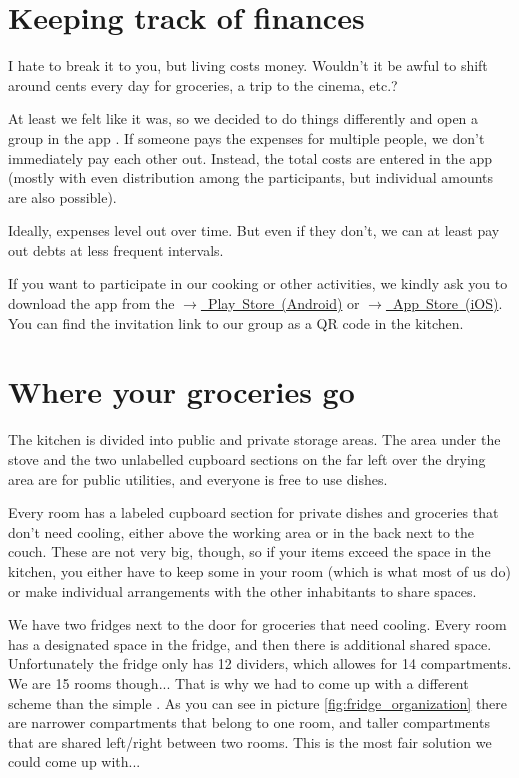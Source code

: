 \section{Keeping track of finances}
I hate to break it to you, but living costs money. Wouldn't it be awful to shift around cents every day for groceries, a trip to the cinema, etc.?

At least we felt like it was, so we decided to do things differently and open a group in the app . If someone pays the expenses for multiple people, we don't immediately pay each other out. Instead, the total costs are entered in the app (mostly with even distribution among the participants, but individual amounts are also possible).

Ideally, expenses level out over time. But even if they don't, we can at least pay out debts at less frequent intervals.

If you want to participate in our cooking or other activities, we kindly ask you to download the app from the \mbox{\href{https://play.google.com/store/apps/details?id=com.Splitwise.SplitwiseMobile&hl=de&pli=1}{$\xrightarrow{}$ Play Store (Android)}} or \mbox{\href{https://apps.apple.com/de/app/splitwise/id458023433}{$\xrightarrow{}$ App Store (iOS)}}. You can find the invitation link to our group as a QR code in the kitchen.

\section{Where your groceries go}
The kitchen is divided into public and private storage areas. The area under the stove and the two unlabelled cupboard sections on the far left over the drying area are for public utilities, and everyone is free to use dishes.

Every room has a labeled cupboard section for private dishes and groceries that don't need cooling, either above the working area or in the back next to the couch. These are not very big, though, so if your items exceed the space in the kitchen, you either have to keep some in your room (which is what most of us do) or make individual arrangements with the other inhabitants to share spaces.

We have two fridges next to the door for groceries that need cooling. Every room has a designated space in the fridge, and then there is additional shared space. Unfortunately the fridge only has 12 dividers, which allowes for 14 compartments. We are 15 rooms though... That is why we had to come up with a different scheme than the simple . As you can see in picture \ref{fig:fridge_organization} there are narrower compartments that belong to one room, and taller compartments that are shared left/right between two rooms. This is the most fair solution we could come up with...

